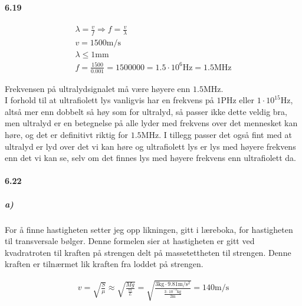 \documentclass[11pt, A4paper,norsk]{article}
\begin{document}
		\paragraph{6.19}
			\begin{gather*}
\lambda = \frac{v}{f} \Rightarrow f = \frac{v}{\lambda} \\
v = 1500 \text{m/s} \\
\lambda \leq 1 \text{mm} \\
f = \frac{1500}{0.001} = 1 500 000 = 1.5 \cdot 10^{6} \text{Hz} = 1.5 \text{MHz}
			\end{gather*}
			\begin{flushleft}
Frekvensen på ultralydsignalet må være høyere enn $1.5$MHz. \\
I forhold til at ultrafiolett lys vanligvis har en frekvens på $1$PHz eller $1 \cdot 10^{15}$Hz, altså mer enn dobbelt så høy som for ultralyd, så passer ikke dette veldig bra, men ultralyd er en betegnelse på alle lyder med frekvens over det mennesket kan høre, og det er definitivt riktig for $1.5$MHz. I tillegg passer det også fint med at ultralyd er lyd over det vi kan høre og ultrafiolett lys er lys med høyere frekvens enn det vi kan se, selv om det finnes lys med høyere frekvens enn ultrafiolett da.
			\end{flushleft}







		\paragraph{6.22}
			\subparagraph{a)}
				\begin{flushleft}
For å finne hastigheten setter jeg opp likningen, gitt i læreboka, for hastigheten til transversale bølger. Denne formelen sier at hastigheten er gitt ved kvadratroten til kraften på strengen delt på massetettheten til strengen. Denne kraften er tilnærmet lik kraften fra loddet på strengen.
				\end{flushleft}
				\begin{gather*}
v = \sqrt{\frac{S}{\mu}} \approx \sqrt{\frac{Mg}{\frac{m}{L}}} = \sqrt{\frac{3\text{kg} \cdot 9.81\text{m/s$^2$}}{\frac{3 \cdot10^{-3}\text{kg}}{2\text{m}}}} = 140 \text{m/s}
				\end{gather*}
\end{document}
